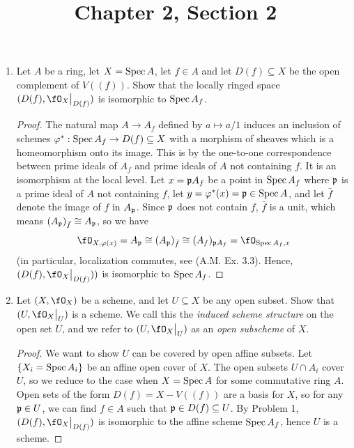 \documentclass[a4paper]{article}
\title{Chapter 2, Section 2}
\begin{document}
\maketitle

\begin{enumerate} [label=\textbf{\arabic*.}, leftmargin=0em]

\item Let $A$ be a ring, let $X = \operatorname{Spec}{A}$, let $f \in A$ and let $D(f) \subseteq X$ be the open complement of $V((f))$. Show that the locally ringed space $(D(f), \restr{\fO_X}{D(f)})$ is isomorphic to $\operatorname{Spec}{A_f}$.

\begin{proof}
    The natural map $A \to A_f$ defined by $a \mapsto a / 1$ induces an inclusion of schemes $\varphi ^* : \operatorname{Spec}{A_f} \to D(f) \subseteq X$ with a morphism of sheaves which is a homeomorphism onto its image. This is by the one-to-one correspondence between prime ideals of $A_f$ and prime ideals of $A$ not containing $f$. It is an isomorphism at the local level. Let $x = \mathfrak{p}A_f$ be a point in $\operatorname{Spec}{A_f}$ where $\mathfrak{p}$ is a prime ideal of $A$ not containing $f$, let $y = \varphi^*(x) = \mathfrak{p} \in \operatorname{Spec}{A}$, and let $\bar{f}$ denote the image of $f$ in $A_{\mathfrak{p}}$. Since $\mathfrak{p}$ does not contain $f$, $\bar{f}$ is a unit, which means $(A_{\mathfrak{p}})_{\bar{f}} \cong A_{\mathfrak{p}}$, so we have
    \begin{equation*}
        \fO_{X, \varphi(x)} = A_\goth{p} \cong (A_\goth{p})_{\bar{f}} \cong (A_f)_{\goth{p}A_f} = \fO_{\spec{A_f}, x}
    \end{equation*}
    (in particular, localization commutes, see (A.M. Ex. 3.3). Hence, $(D(f), \restr{\fO_X}{D(f)}))$ is isomorphic to $\operatorname{Spec}{A_f}$.
\end{proof}

\item Let $(X, \fO_X)$ be a scheme, and let $U \subseteq X$ be any open subset. Show that $(U, \restr{\fO_X}{U})$ is a scheme. We call this the \textit{induced scheme structure} on the open set $U$, and we refer to $(U, \restr{\fO_X}{U})$ as an \textit{open subscheme} of $X$.

\begin{proof}
    We want to show $U$ can be covered by open affine subsets. Let $\{ X_i = \operatorname{Spec}{A_i} \}$ be an affine open cover of $X$. The open subsets $U \cap A_i$ cover $U$, so we reduce to the case when $X = \operatorname{Spec}{A}$ for some commutative ring $A$. Open sets of the form $D(f) = X - V((f))$ are a basis for $X$, so for any $\mathfrak{p} \in U$, we can find $f \in A$ such that $\mathfrak{p} \in D(f) \subseteq U$. By Problem 1, $(D(f), \restr{\fO_X}{D(f)})$ is isomorphic to the affine scheme $\operatorname{Spec}{A_f}$, hence $U$ is a scheme.
\end{proof}


\end{enumerate}
\end{document}
